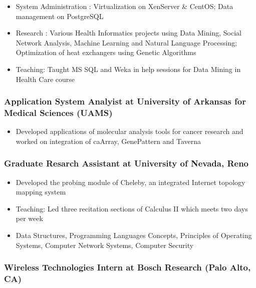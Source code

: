 \documentclass[11pt, letter]{article}
\begin{document}
\begin{raggedright}
\begin{itemize}
\itemsep1pt\parskip0pt
\item
  System Administration : Virtualization on XenServer \& CentOS; Data
  management on PostgreSQL
\item
  Research : Various Health Informatics projects using Data Mining,
  Social Network Analysis, Machine Learning and Natural Language
  Processing; Optimization of heat exchangers using Genetic Algorithms
\item
  Teaching: Taught MS SQL and Weka in help sessions for Data Mining in
  Health Care course
\end{itemize}

\subsubsection{Application System Analyist at University of Arkansas for
Medical Sciences
(UAMS)}\label{application-system-analyist-at-university-of-arkansas-for-medical-sciences-uams}

\begin{itemize}
\itemsep1pt\parskip0pt
\item
  Developed applications of molecular analysis tools for cancer research
  and worked on integration of caArray, GenePattern and Taverna
\end{itemize}

\subsubsection{Graduate Resarch Assistant at University of Nevada,
Reno}\label{graduate-resarch-assistant-at-university-of-nevada-reno}

\begin{itemize}
\itemsep1pt\parskip0pt
\item
  Developed the probing module of Cheleby, an integrated Internet
  topology mapping system
\item
  Teaching: Led three recitation sections of Calculus II which meets two
  days per week
\item
  Data Structures, Programming Languages Concepts, Principles of
  Operating Systems, Computer Network Systems, Computer Security
\end{itemize}

\subsubsection{Wireless Technologies Intern at Bosch Research (Palo
Alto,
CA)}\label{wireless-technologies-intern-at-bosch-research-palo-alto-ca}


\end{raggedright}
\end{document}
